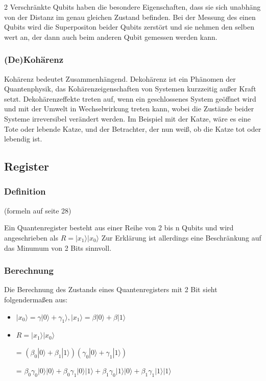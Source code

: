 2 Verschränkte Qubits haben die besondere Eigenschaften, dass sie sich unabhäng von der Distanz im genau gleichen Zustand befinden. Bei der Messung des einen Qubits wird die Superpositon beider Qubits zerstört und sie nehmen den selben wert an, der dann auch beim anderen Qubit gemessen werden kann.


\subsubsection{(De)Kohärenz}
\label{sec:Kohaerenz}

Kohärenz bedeutet Zusammenhängend. Dekohärenz ist ein Phänomen der Quantenphysik, das Kohärenzeigenschaften von Systemen kurzzeitig außer Kraft setzt. Dekohärenzeffekte treten auf, wenn ein geschlossenes System geöffnet wird und mit der Umwelt in Wechselwirkung treten kann, wobei die Zustände beider Systeme irreversibel verändert werden.
Im Beispiel mit der Katze, wäre es eine Tote oder lebende Katze, und der Betrachter, der nun weiß, ob die Katze tot oder lebendig ist.

\subsection{Register}
\label{sec:Register}

\subsubsection{Definition}
\label{sec:Register_Definition}
(formeln auf seite 28)

Ein Quantenregister besteht aus einer Reihe von 2 bis n Qubits und wird angeschrieben als $R = |x_1\rangle|x_0\rangle$
Zur Erklärung ist allerdings eine Beschränkung auf das Minumum von 2 Bits sinnvoll.


\subsubsection{Berechnung}
\label{sec:Berechnung}

Die Berechnung des Zustands eines Quantenregisters mit 2 Bit sieht folgendermaßen aus:
\begin{itemize}
    \item $|x_0\rangle = \gamma|0\rangle + \gamma_1\rangle, |x_1\rangle = \beta|0\rangle + \beta|1\rangle$
    \item $R = |x_1\rangle|x_0\rangle$
	\item[=] $(\beta_0|0\rangle+\beta_1|1\rangle)(\gamma_0|0\rangle+\gamma_1|1\rangle)$
	\item[=] $\beta_0\gamma_0|0\rangle|0\rangle+\beta_0\gamma_1|0\rangle|1\rangle+\beta_1\gamma_0|1\rangle|0\rangle+\beta_1\gamma_1|1\rangle|1\rangle$
\end{itemize}


